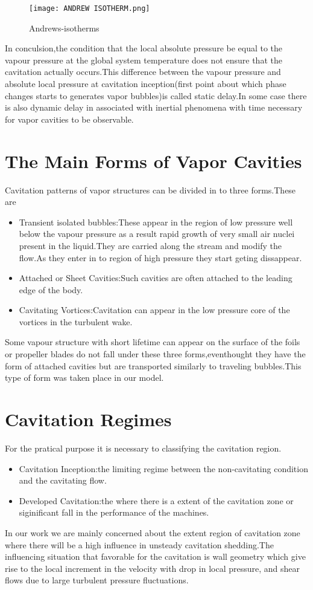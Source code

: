  
\begin{figure}[H]
    \centering
    \texttt{[image: ANDREW ISOTHERM.png]}
    \caption{Andrews-isotherms}
    \label{fig:fig2}
\end{figure}
In conculsion,the condition that the local absolute pressure be equal to the vapour pressure at the global system temperature does not ensure that the cavitation actually occurs.This difference between the
vapour pressure and absolute local pressure at cavitation inception(first point about which phase changes starts to generates vapor bubbles)is called static delay.In some case there is also dynamic delay in 
associated with inertial phenomena with time necessary for vapor cavities to be observable.\\

\section{The Main Forms of Vapor Cavities}
Cavitation patterns of vapor structures can be divided in to three forms.These are
\begin{itemize}
\item Transient isolated bubbles:These appear in the region of low pressure well below the vapour pressure as a result rapid growth of very small air nuclei present in the liquid.They are carried along the 
stream and modify the flow.As they enter in to region of high pressure they start geting dissappear.
\item Attached or Sheet Cavities:Such cavities are often attached to the leading edge of the body.
\item Cavitating Vortices:Cavitation can appear in the low pressure core of the vortices in the turbulent wake.
\end{itemize}
Some vapour structure with short lifetime can appear on the surface of the foils or propeller blades do not fall under these three forms,eventhought they have the form of attached cavities but are 
transported similarly to traveling bubbles.This type of form was taken place in our model.\\
\section{Cavitation Regimes}
For the pratical purpose it is necessary to classifying the cavitation region.
\begin{itemize}
\item Cavitation Inception:the limiting regime between the non-cavitating condition and the cavitating flow.
\item Developed Cavitation:the where there is a extent of the cavitation zone or siginificant fall in the performance of the machines.
\end{itemize}
In our work we are mainly concerned about the extent region of cavitation zone where there will be  a high influence in unsteady cavitation shedding.The influencing situation that favorable for the 
cavitation is wall geometry which give rise to the local increment in the velocity with drop in local pressure, and shear flows due to large turbulent pressure fluctuations.\\
